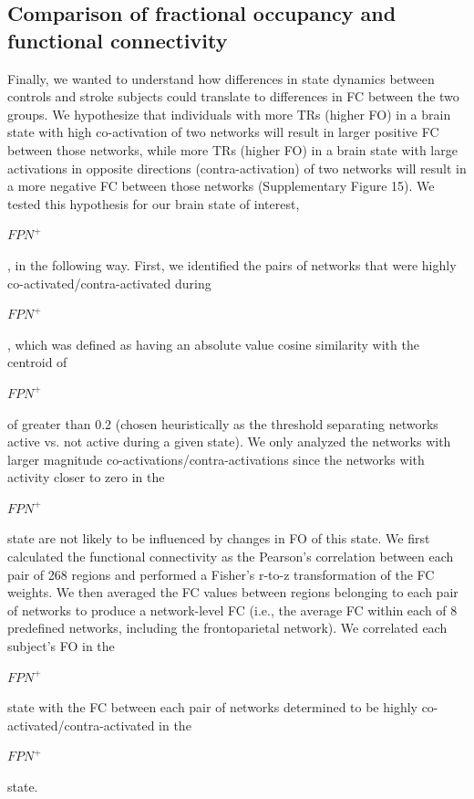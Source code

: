 \documentclass[phd,tocprelim]{cornell}
\begin{document}
    \subsection*{Comparison of fractional occupancy and functional connectivity}
    Finally, we wanted to understand how differences in state dynamics between controls and stroke subjects could translate to differences in FC between the two groups. We hypothesize that individuals with more TRs (higher FO) in a brain state with high co-activation of two networks will result in larger positive FC between those networks, while more TRs (higher FO) in a brain state with large activations in opposite directions (contra-activation) of two networks will result in a more negative FC between those networks (Supplementary Figure 15). We tested this hypothesis for our brain state of interest,  \begin{Large}$FPN^+$ \end{Large}, in the following way. First, we identified the pairs of networks that were highly co-activated/contra-activated during  \begin{Large}$FPN^+$ \end{Large}, which was defined as having an absolute value cosine similarity with the centroid of  \begin{Large}$FPN^+$ \end{Large} of greater than 0.2 (chosen heuristically as the threshold separating networks active vs. not active during a given state). We only analyzed the networks with larger magnitude co-activations/contra-activations since the networks with activity closer to zero in the  \begin{Large}$FPN^+$ \end{Large} state are not likely to be influenced by changes in FO of this state. We first calculated the functional connectivity as the Pearson's correlation between each pair of 268 regions and performed a Fisher's r-to-z transformation of the FC weights. We then averaged the FC values between regions belonging to each pair of networks to produce a network-level FC (i.e., the average FC within each of 8 predefined networks, including the frontoparietal network). We correlated each subject's FO in the  \begin{Large}$FPN^+$ \end{Large} state with the FC between each pair of networks determined to be highly co-activated/contra-activated in the  \begin{Large}$FPN^+$ \end{Large} state.
\end{document}
